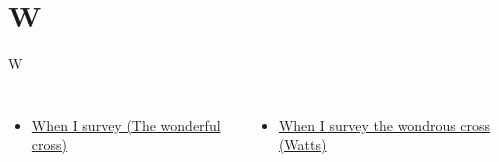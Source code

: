 \documentclass{beamer}
\begin{document}
\section{W}

\begin{frame}{W}
\begin{columns}
    \begin{itemize}
    \item \hyperlink{The wonderful cross['When I survey'](Tomlin)1}{When I survey (The wonderful cross)}
\end{itemize}
    \begin{itemize}
    \item \hyperlink{When I survey the wondrous cross[](Watts)1}{When I survey the wondrous cross (Watts)}
\end{itemize}


\end{columns}

\end{frame}
\end{document}
